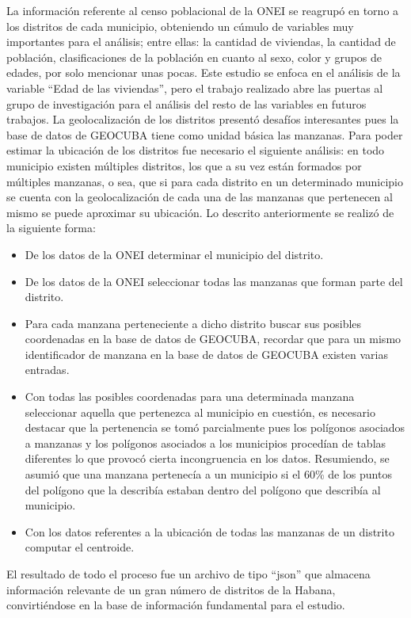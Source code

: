 La información referente al censo poblacional de la ONEI se reagrupó en torno a los distritos de cada municipio, obteniendo un cúmulo de variables muy importantes para el análisis; entre ellas: la cantidad de viviendas, la cantidad de población, clasificaciones de la población en cuanto al sexo, color y grupos de edades, por solo mencionar unas pocas. Este estudio se enfoca en el análisis de la variable “Edad de las viviendas”, pero el trabajo realizado abre las puertas al grupo de investigación para el análisis del resto de las variables en futuros trabajos. La geolocalización de los distritos presentó desafíos interesantes pues la base de datos de GEOCUBA tiene como unidad básica las manzanas. Para poder estimar la ubicación de los distritos fue necesario el siguiente análisis: en todo municipio existen múltiples distritos, los que a su vez están formados por múltiples manzanas, o sea, que si para cada distrito en un determinado municipio se cuenta con la geolocalización de cada una de las manzanas que pertenecen al mismo se puede aproximar su ubicación. Lo descrito anteriormente se realizó de la siguiente forma:
\begin{itemize}
	\item De los datos de la ONEI determinar el municipio del distrito.
	\item De los datos de la ONEI seleccionar todas las manzanas que forman parte del distrito.
	\item Para cada manzana perteneciente a dicho distrito buscar sus posibles coordenadas en la base de datos de GEOCUBA, recordar que para un mismo identificador de manzana en la base de datos de GEOCUBA existen varias entradas.
	\item Con todas las posibles coordenadas para una determinada manzana seleccionar aquella que pertenezca al municipio en cuestión, es necesario destacar que la pertenencia se tomó parcialmente pues los polígonos asociados a manzanas y los polígonos asociados a los municipios procedían de tablas diferentes lo que provocó cierta incongruencia en los datos. Resumiendo, se asumió que una manzana pertenecía a un municipio si el 60\% de los puntos del polígono que la describía estaban dentro del polígono que describía al municipio.
	\item Con los datos referentes a la ubicación de todas las manzanas de un distrito computar el centroide.
\end{itemize}

El resultado de todo el proceso fue un archivo de tipo “json” que almacena información relevante de un gran número de distritos de la Habana, convirtiéndose en la base de información fundamental para el estudio. 




